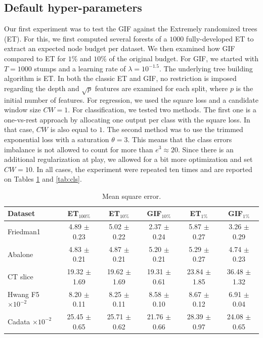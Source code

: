 \documentclass{article}
\newcommand{\bestA}{\cellcolor{orange}}
\newcommand{\bestB}{\cellcolor{dodgerblue}}
\begin{document}
\subsection{Default hyper-parameters}
Our first experiment was to test the GIF against the Extremely randomized trees 
(ET).
For this, we first computed several forests of a $1000$ fully-developed ET to 
extract an expected node budget per dataset. We then examined how GIF compared 
to ET for $1\%$ and $10\%$ of the original budget.
For GIF, we started with $T=1000$ stumps and a learning rate of $\lambda = 
10^{-1.5}$. The underlying tree building algorithm is ET. In both the classic 
ET and GIF, no restriction is imposed regarding the depth and $\sqrt{p}$ 
features are examined for each split, where $p$ is the initial number of 
features.
For regression, we used the square loss and a candidate window size $CW=1$. 
For classification, we tested two methods. The first one is a one-vs-rest 
approach by allocating one output per class with the square loss. In that case, 
$CW$ is also equal to $1$. The second method was to use the trimmed exponential 
loss with a saturation $\theta = 3$. This means that the class errors imbalance 
is not allowed to count for more than $e^3 \approx 20$. Since there is an 
additional regularization at play, we allowed for a bit more optimization and 
set $CW=10$. In all cases, the experiment were repeated ten times and are 
reported on Tables \ref{tab:reg} and \ref{tab:cls}.
  
\begin{table}[t]
\caption{Mean square error.}
\label{tab:reg}
\vskip 0.15in
\begin{center}
\begin{small}
\begin{sc}
\begin{tabular}{l|c|cc|cc}
\hline
Dataset & ET$_{100\%}$ & ET$_{10\%}$ & GIF$_{10\%}$ & ET$_{1\%}$ & GIF$_{1\%}$\\
\hline
Friedman1 & 4.89 $\pm$ 0.23 & 5.02 $\pm$ 0.22 & \bestA 2.37 $\pm$ 0.24 & 5.87 
$\pm$ 0.27 & \bestB 3.26 $\pm$ 0.29 \\
Abalone & 4.83 $\pm$ 0.21 & \bestA 4.87 $\pm$ 0.21 & 5.20 $\pm$ 0.21 & 5.29 
$\pm$ 0.27 & \bestB 4.74 $\pm$ 0.23 \\
CT slice & 19.32 $\pm$ 1.69 & 19.62 $\pm$ 1.69 & \bestA 19.31 $\pm$ 0.61 & 
\bestB 23.84 $\pm$ 1.85 & 36.48 $\pm$ 1.32 \\
Hwang F5 \hfill {\tiny $\times 10^{-2}$} & 8.20 $\pm$ 0.11 & \bestA 8.25 $\pm$ 
0.11 & 8.58 $\pm$ 0.10 & 8.67 $\pm$ 0.12 & \bestB 6.91 $\pm$ 0.04 \\
Cadata \hfill {\tiny $\times 10^{-2}$} & 25.45 $\pm$ 0.65 & 25.71 $\pm$ 0.62 & 
\bestA 21.76 $\pm$ 0.66 & 28.39 $\pm$ 0.97 & \bestB 24.08 $\pm$ 0.65 \\
\hline
\end{tabular}
\end{sc}
\end{small}
\end{center}
\vskip -0.1in
\end{table}
\end{document}
